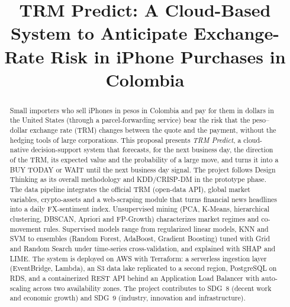 \documentclass[conference]{IEEEtran}
\begin{document}
\title{TRM Predict: A Cloud-Based System to Anticipate Exchange-Rate Risk in iPhone Purchases in Colombia}

\author{
}

\maketitle

\begin{abstract}
Small importers who sell iPhones in pesos in Colombia and pay for them in dollars in the United States (through a parcel-forwarding service) bear the risk that the peso--dollar exchange rate (TRM) changes between the quote and the payment, without the hedging tools of large corporations. This proposal presents \emph{TRM Predict}, a cloud-native decision-support system that forecasts, for the next business day, the direction of the TRM, its expected value and the probability of a large move, and turns it into a BUY TODAY or WAIT until the next business day signal. The project follows Design Thinking as its overall methodology and KDD/CRISP-DM in the prototype phase. The data pipeline integrates the official TRM (open-data API), global market variables, crypto-assets and a web-scraping module that turns financial news headlines into a daily FX-sentiment index. Unsupervised mining (PCA, K-Means, hierarchical clustering, DBSCAN, Apriori and FP-Growth) characterizes market regimes and co-movement rules. Supervised models range from regularized linear models, KNN and SVM to ensembles (Random Forest, AdaBoost, Gradient Boosting) tuned with Grid and Random Search under time-series cross-validation, and explained with SHAP and LIME. The system is deployed on AWS with Terraform: a serverless ingestion layer (EventBridge, Lambda), an S3 data lake replicated to a second region, PostgreSQL on RDS, and a containerized REST API behind an Application Load Balancer with auto-scaling across two availability zones. The project contributes to SDG~8 (decent work and economic growth) and SDG~9 (industry, innovation and infrastructure).
\end{abstract}
\end{document}
